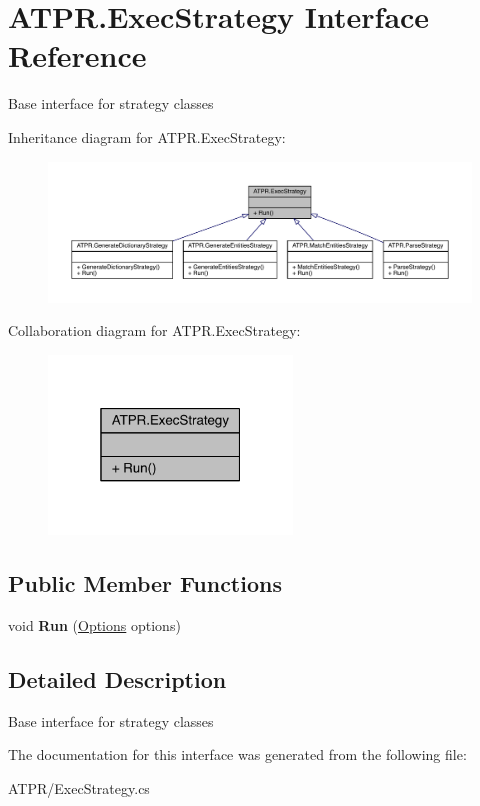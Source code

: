 \hypertarget{interface_a_t_p_r_1_1_exec_strategy}{}\section{A\+T\+P\+R.\+Exec\+Strategy Interface Reference}
\label{interface_a_t_p_r_1_1_exec_strategy}


Base interface for strategy classes  




Inheritance diagram for A\+T\+P\+R.\+Exec\+Strategy\+:
\nopagebreak
\begin{figure}[H]
\begin{center}
\leavevmode
\includegraphics[width=350pt]{d2/d3b/interface_a_t_p_r_1_1_exec_strategy__inherit__graph}
\end{center}
\end{figure}


Collaboration diagram for A\+T\+P\+R.\+Exec\+Strategy\+:
\nopagebreak
\begin{figure}[H]
\begin{center}
\leavevmode
\includegraphics[width=184pt]{d9/db3/interface_a_t_p_r_1_1_exec_strategy__coll__graph}
\end{center}
\end{figure}
\subsection*{Public Member Functions}
\begin{DoxyCompactItemize}
\item 
\hypertarget{interface_a_t_p_r_1_1_exec_strategy_aaedec6af95b4eaad55142be83f228159}{}\label{interface_a_t_p_r_1_1_exec_strategy_aaedec6af95b4eaad55142be83f228159} 
void {\bfseries Run} (\hyperlink{class_a_t_p_r_1_1_options}{Options} options)
\end{DoxyCompactItemize}


\subsection{Detailed Description}
Base interface for strategy classes 



The documentation for this interface was generated from the following file\+:\begin{DoxyCompactItemize}
\item 
A\+T\+P\+R/Exec\+Strategy.\+cs\end{DoxyCompactItemize}
